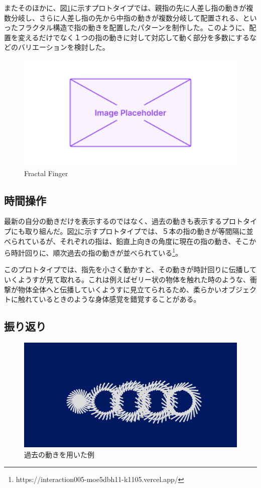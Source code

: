 またそのほかに、図\ref{fig:fractal_finger}に示すプロトタイプでは、親指の先に人差し指の動きが複数分岐し、さらに人差し指の先から中指の動きが複数分岐して配置される、といったフラクタル構造で指の動きを配置したパターンを制作した。このように、配置を変えるだけでなく１つの指の動きに対して対応して動く部分を多数にするなどのバリエーションを検討した。

\begin{figure}[H]
  \centering
  \includegraphics[width=15cm]{img/placeholder.png}
  \caption{Fractal Finger}
  \label{fig:fractal_finger}
\end{figure}
\subsection*{時間操作}
最新の自分の動きだけを表示するのではなく、過去の動きも表示するプロトタイプにも取り組んだ。図\ref{fig:prototype_delay}に示すプロトタイプでは、５本の指の動きが等間隔に並べられているが、それぞれの指は、鉛直上向きの角度に現在の指の動き、そこから時計回りに、順次過去の指の動きが並べられている\footnote{https://interaction005-moe5dbh11-k1105.vercel.app/}。

このプロトタイプでは、指先を小さく動かすと、その動きが時計回りに伝播していくようすが見て取れる。これは例えばゼリー状の物体を触れた時のような、衝撃が物体全体へと伝播していくようすに見立てられるため、柔らかいオブジェクトに触れているときのような身体感覚を錯覚することがある。

\subsection*{振り返り}

\begin{figure}[H]
  \centering
  \includegraphics[width=15cm]{img/past_time.png}
  \caption{過去の動きを用いた例}
  \label{fig:prototype_delay}
\end{figure}
